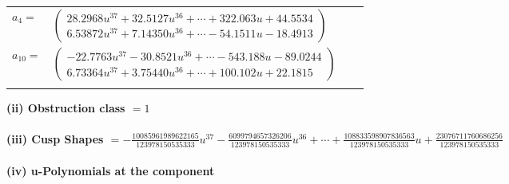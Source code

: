 \documentclass[1p]{elsarticle_modified}
\theoremstyle{definition}
\begin{document}
\begin{tabular}{m{7pt} m{180pt} m{7pt} m{180pt} }
\flushright $a_{4}=$&$\begin{pmatrix}28.2968 u^{37}+32.5127 u^{36}+\cdots+322.063 u+44.5534\\6.53872 u^{37}+7.14350 u^{36}+\cdots-54.1511 u-18.4913\end{pmatrix}$ \\
\flushright $a_{10}=$&$\begin{pmatrix}-22.7763 u^{37}-30.8521 u^{36}+\cdots-543.188 u-89.0244\\6.73364 u^{37}+3.75440 u^{36}+\cdots+100.102 u+22.1815\end{pmatrix}$\\&\end{tabular}
\flushleft \textbf{(ii) Obstruction class $= 1$}\\~\\
\flushleft \textbf{(iii) Cusp Shapes $= -\frac{10085961989622165}{123978150535333} u^{37}-\frac{6099794657326206}{123978150535333} u^{36}+\cdots+\frac{108833598907836563}{123978150535333} u+\frac{23076711760686256}{123978150535333}$}\\~\\
\newpage\renewcommand{\arraystretch}{1}
\flushleft \textbf{(iv) u-Polynomials at the component}\newline \\
\end{document}
